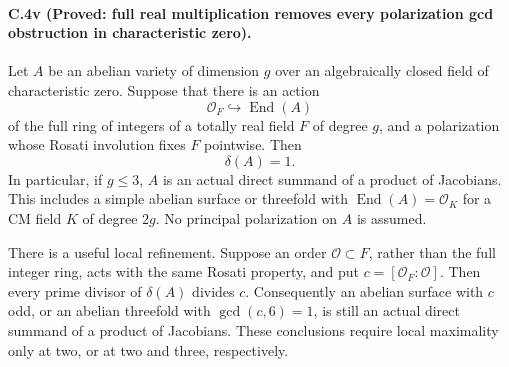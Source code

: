 \paragraph{C.4v (Proved: full real multiplication removes every polarization gcd obstruction in characteristic zero).}
Let \(A\) be an abelian variety of dimension \(g\) over an
algebraically closed field of characteristic zero. Suppose that
there is an action
\[
                  \mathcal O_F\hookrightarrow\operatorname{End}(A)
\]
of the full ring of integers of a totally real field \(F\) of
degree \(g\), and a polarization whose Rosati involution fixes
\(F\) pointwise. Then
\[
                              \delta(A)=1.
\]
In particular, if \(g\le3\), \(A\) is an actual direct summand
of a product of Jacobians. This includes a simple abelian
surface or threefold with
\(\operatorname{End}(A)=\mathcal O_K\) for a CM field \(K\)
of degree \(2g\). No principal polarization on \(A\) is assumed.

There is a useful local refinement. Suppose an order
\(\mathcal O\subset F\), rather than the full integer ring,
acts with the same Rosati property, and put
\(c=[\mathcal O_F:\mathcal O]\). Then every prime divisor
of \(\delta(A)\) divides \(c\). Consequently an abelian
surface with \(c\) odd, or an abelian threefold with
\(\gcd(c,6)=1\), is still an actual direct summand of a
product of Jacobians. These conclusions require local
maximality only at two, or at two and three, respectively.


